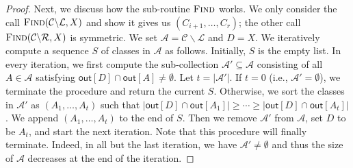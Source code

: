 \begin{proof}
Next, we discuss how the sub-routine $\textsc{Find}$ works.
We only consider the call $\textsc{Find}(\mathcal{C} \backslash \mathcal{L},X)$ and show it gives us $(C_{i+1},\dots,C_r)$; the other call $\textsc{Find}(\mathcal{C} \backslash \mathcal{R},X)$ is symmetric.
We set $\mathcal{A} = \mathcal{C} \backslash \mathcal{L}$ and $D = X$.
We iteratively compute a sequence $S$ of classes in $\mathcal{A}$ as follows.
Initially, $S$ is the empty list.
In every iteration, we first compute the sub-collection $\mathcal{A}' \subseteq \mathcal{A}$ consisting of all $A \in \mathcal{A}$ satisfying $\mathsf{out}[D] \cap \mathsf{out}[A] \neq \emptyset$.
Let $t = |\mathcal{A}'|$.
If $t = 0$ (i.e., $\mathcal{A}' = \emptyset$), we terminate the procedure and return the current $S$.
Otherwise, we sort the classes in $\mathcal{A}'$ as $(A_1,\dots,A_t)$ such that $|\mathsf{out}[D] \cap \mathsf{out}[A_1]| \geq \cdots \geq |\mathsf{out}[D] \cap \mathsf{out}[A_t]|$.
We append $(A_1,\dots,A_t)$ to the end of $S$.
Then we remove $\mathcal{A}'$ from $\mathcal{A}$, set $D$ to be $A_t$, and start the next iteration.
Note that this procedure will finally terminate.
Indeed, in all but the last iteration, we have $\mathcal{A}' \neq \emptyset$ and thus the size of $\mathcal{A}$ decreases at the end of the iteration.


\end{proof}
